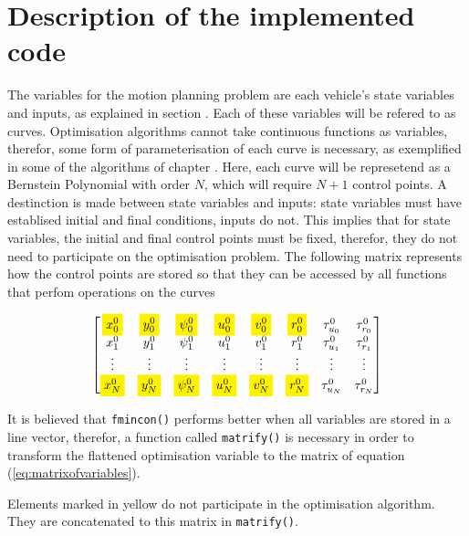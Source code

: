 \section{Description of the implemented code}
\label{sec:description_implementation}

\par The variables for the motion planning problem are each vehicle's state variables and inputs, as explained in section \label{sec:theoptproblem}. Each of these variables will be refered to as curves. Optimisation algorithms cannot take continuous functions as variables, therefor, some form of parameterisation of each curve is necessary, as exemplified in some of the algorithms of chapter \label{chap:theory}. Here, each curve will be represetend as a Bernstein Polynomial with order $N$, which will require $N+1$ control points. A destinction is made between state variables and inputs: state variables must have establised initial and final conditions, inputs do not. This implies that for state variables, the initial and final control points must be fixed, therefor, they do not need to participate on the optimisation problem. The following matrix represents how the control points are stored so that they can be accessed by all functions that perfom operations on the curves

\begin{equation}
    \begin{bmatrix}
        \colorbox{yellow}{$\displaystyle x_0^0$} & \colorbox{yellow}{$\displaystyle y_0^0$} & \colorbox{yellow}{$\displaystyle \psi_0^0$} & \colorbox{yellow}{$\displaystyle u_0^0$} & \colorbox{yellow}{$\displaystyle v_0^0$} & \colorbox{yellow}{$\displaystyle r_0^0$} & \tau_{u_0}^0 & \tau_{r_0}^0 \\
        x_1^0 & y_1^0 & \psi_1^0 & u_1^0 & v_1^0 & r_1^0 & \tau_{u_1}^0 & \tau_{r_1}^0 \\
        \vdots & \vdots & \vdots & \vdots & \vdots & \vdots & \vdots & \vdots \\
        \colorbox{yellow}{$x_{N}^0$} & \colorbox{yellow}{$y_{N}^0$} & \colorbox{yellow}{$\psi_{N}^0$} & \colorbox{yellow}{$u_{N}^0$} & \colorbox{yellow}{$v_{N}^0$} & \colorbox{yellow}{$r_{N}^0$} & \tau_{u_{N}}^0 & \tau_{r_{N}}^0
    \end{bmatrix}
    \label{eq:matrixofvariables}
\end{equation}

\par It is believed  that \texttt{fmincon()} performs better when all variables are stored in a line vector, therefor, a function called \texttt{matrify()} is necessary in order to transform the flattened optimisation variable to the matrix of equation (\ref{eq:matrixofvariables}). 
\par Elements marked in yellow do not participate in the optimisation algorithm. They are concatenated to this matrix in \texttt{matrify()}. 

